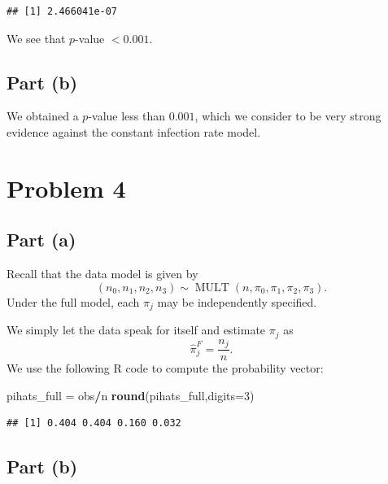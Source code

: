 \documentclass[
]{article}
\newenvironment{Shaded}{\begin{snugshade}}{\end{snugshade}}
\newcommand{\AttributeTok}[1]{\textcolor[rgb]{0.13,0.29,0.53}{#1}}
\newcommand{\DecValTok}[1]{\textcolor[rgb]{0.00,0.00,0.81}{#1}}
\newcommand{\FunctionTok}[1]{\textcolor[rgb]{0.13,0.29,0.53}{\textbf{#1}}}
\newcommand{\NormalTok}[1]{#1}
\newcommand{\OtherTok}[1]{\textcolor[rgb]{0.56,0.35,0.01}{#1}}
\newcommand{\SpecialCharTok}[1]{\textcolor[rgb]{0.81,0.36,0.00}{\textbf{#1}}}
\begin{document}
\begin{verbatim}
## [1] 2.466041e-07
\end{verbatim}

We see that \(p\)-value \(< 0.001\).

\hypertarget{part-b}{%
\subsection{Part (b)}\label{part-b}}


We obtained a \(p\)-value less than \(0.001\), which we consider to be
very strong evidence against the constant infection rate model.

\hypertarget{problem-4}{%
\section{Problem 4}\label{problem-4}}

\hypertarget{part-a-1}{%
\subsection{Part (a)}\label{part-a-1}}


Recall that the data model is given by \[
  (n_0,n_1,n_2,n_3) \sim \operatorname{MULT}(n,\pi_0,\pi_1,\pi_2,\pi_3).
\] Under the full model, each \(\pi_j\) may be independently specified.

We simply let the data speak for itself and estimate \(\pi_j\) as \[
  \hat\pi_j^{F} = \frac{n_j}{n}.
\] We use the following R code to compute the probability vector:

\begin{Shaded}
\begin{Highlighting}[]
\NormalTok{pihats\_full }\OtherTok{=}\NormalTok{ obs}\SpecialCharTok{/}\NormalTok{n}
\FunctionTok{round}\NormalTok{(pihats\_full,}\AttributeTok{digits=}\DecValTok{3}\NormalTok{)}
\end{Highlighting}
\end{Shaded}

\begin{verbatim}
## [1] 0.404 0.404 0.160 0.032
\end{verbatim}

\hypertarget{part-b-1}{%
\subsection{Part (b)}\label{part-b-1}}
\end{document}
